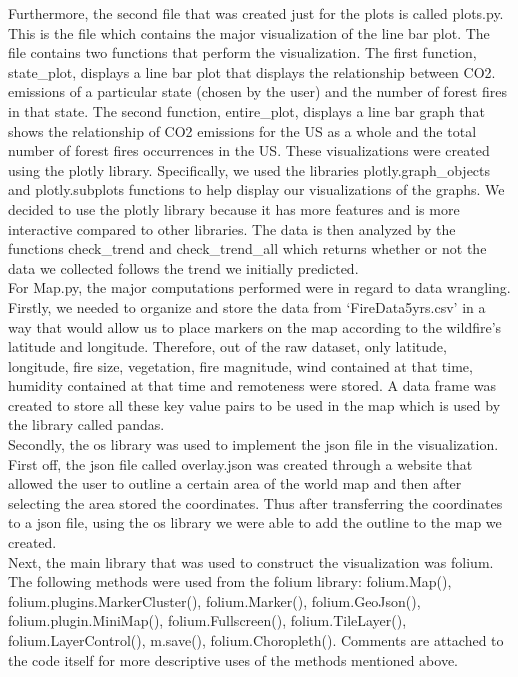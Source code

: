 \documentclass[fontsize=11pt]{article}
\begin{document}
\newline
Furthermore, the second file that was created just for the plots is called plots.py. This is the file which contains the major visualization of the line bar plot. The file contains two functions that perform the visualization. The first function, state\_plot, displays a line bar plot that displays the relationship between CO2. emissions of a particular state (chosen by the user) and the number of forest fires in that state. The second function, entire\_plot, displays a line bar graph that shows the relationship of CO2 emissions for the US as a whole and the total number of forest fires occurrences  in the US. These visualizations were created using the plotly library. Specifically, we used the libraries plotly.graph\_objects and plotly.subplots functions to help display our visualizations of the graphs. We decided to use the plotly library because it has more features and is more interactive compared to other libraries. 
The data is then analyzed by the functions check\_trend and check\_trend\_all which returns whether or not the data we collected follows the trend we initially predicted. \\
\newline
For Map.py, the major computations performed were in regard to data wrangling. Firstly, we needed to organize and store the data from ‘FireData5yrs.csv’ in a way that would allow us to place markers on the map according to the wildfire’s latitude and longitude. Therefore, out of the raw dataset, only latitude, longitude, fire size, vegetation, fire magnitude, wind contained at that time, humidity contained at that time and remoteness were stored. A data frame was created to store all these key value pairs to be used in the map which is used by the library called pandas.\\
\newline
Secondly, the os library was used to implement the json file in the visualization. First off, the json file called overlay.json was created through a website that allowed the user to outline a certain area of the world map and then after selecting the area stored the coordinates. Thus after transferring the coordinates to a json file, using the os library we were able to add the outline to the map we created. \\
\newline
Next, the main library that was used to construct the visualization was folium. The following methods were used from the folium library: folium.Map(), folium.plugins.MarkerCluster(), folium.Marker(), folium.GeoJson(), folium.plugin.MiniMap(), folium.Fullscreen(), folium.TileLayer(), folium.LayerControl(), m.save(), folium.Choropleth(). Comments are attached to the code itself for more descriptive uses of the methods mentioned above.  
\end{document}
